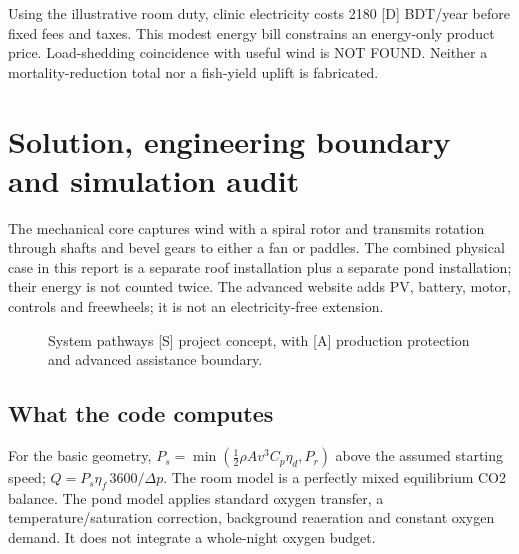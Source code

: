 \documentclass[11pt,a4paper]{article}
\begin{document}
Using the illustrative room duty, clinic electricity costs \num{2180} [D] BDT/year before fixed fees and taxes. This modest energy bill constrains an energy-only product price. Load-shedding coincidence with useful wind is NOT FOUND. Neither a mortality-reduction total nor a fish-yield uplift is fabricated.

\clearpage\section{Solution, engineering boundary and simulation audit}
The mechanical core captures wind with a spiral rotor and transmits rotation through shafts and bevel gears to either a fan or paddles. The combined physical case in this report is a separate roof installation plus a separate pond installation; their energy is not counted twice. The advanced website adds PV, battery, motor, controls and freewheels; it is not an electricity-free extension. \cite{poster,project,site}

\begin{figure}[htbp]\centering
{}\caption{System pathways [S] project concept, with [A] production protection and advanced assistance boundary.}\end{figure}
\subsection{What the code computes}
For the basic geometry, $P_s=\min(\tfrac12\rho A v^3C_p\eta_d,P_r)$ above the assumed starting speed; $Q=P_s\eta_f\,3600/\Delta p$. The room model is a perfectly mixed equilibrium CO2 balance. The pond model applies standard oxygen transfer, a temperature/saturation correction, background reaeration and constant oxygen demand. It does not integrate a whole-night oxygen budget. \cite{site}
\end{document}
